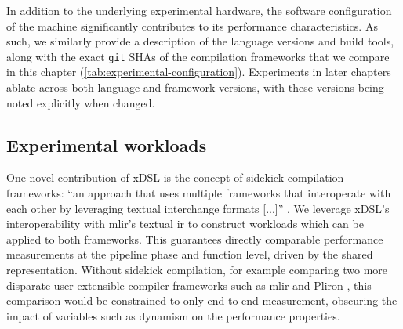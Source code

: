 In addition to the underlying experimental hardware, the software configuration of the machine significantly contributes to its performance characteristics.
As such, we similarly provide a description of the language versions and build tools, along with the exact \texttt{git} SHAs of the compilation frameworks that we compare in this chapter (\autoref{tab:experimental-configuration}).
Experiments in later chapters ablate across both language and framework versions, with these versions being noted explicitly when changed.



\subsection{Experimental workloads}
\label{ssec:experimental-workloads}

One novel contribution of xDSL is the concept of sidekick compilation frameworks: ``an approach that uses multiple frameworks that interoperate with each other by leveraging textual interchange formats [...]'' \cite{fehrXDSLSidekickCompilation2025}.
We leverage xDSL's interoperability with \ac{mlir}'s textual \ac{ir} to construct workloads which can be applied to both frameworks.
This guarantees directly comparable performance measurements at the pipeline phase and function level, driven by the shared representation.
Without sidekick compilation, for example comparing two more disparate user-extensible compiler frameworks such as \ac{mlir} and Pliron \cite{vaivaswathanagarajVaivaswathaPliron2025}, this comparison would be constrained to only end-to-end measurement, obscuring the impact of variables such as dynamism on the performance properties.

